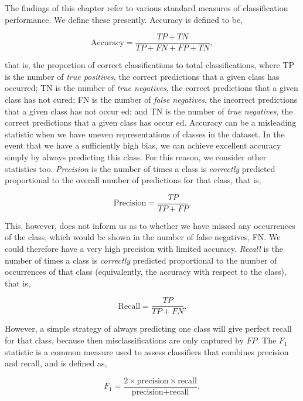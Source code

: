 The findings of this chapter refer to various standard measures of classification performance. We define these presently. Accuracy is defined to be,

\begin{equation}
\text{Accuracy} = \frac{TP + TN}{TP + FN + FP + TN},
\label{eq:accuracy}
\end{equation}

that is, the proportion of correct classifications to total classifications, where TP is the number of \emph{true positives}, the correct predictions that a given class has occurred; TN is the number of \emph{true negatives}, the correct predictions that a given class has not cured; FN is the number of \emph{false negatives}, the incorrect predictions that a given class has not occur ed; and TN is the number of \emph{true negatives}, the correct predictions that a given class has occur ed. Accuracy can be a misleading statistic when we have uneven representations of classes in the dataset. In the event that we have a sufficiently high bias, we can achieve excellent accuracy simply by always predicting this class. For this reason, we consider other statistics too. \emph{Precision} is the number of times a class is \emph{correctly} predicted proportional to the overall number of predictions for that class, that is,

\begin{equation}
\text{Precision} = \frac{TP}{TP + FP}.
\label{eq:precision}
\end{equation}

This, however, does not inform us as to whether we have missed any occurrences of the class, which would be shown in the number of false negatives, FN. We could therefore have a very high precision with limited accuracy. \emph{Recall} is the number of times a class is \emph{correctly} predicted proportional to the number of occurrences of that class (equivalently, the accuracy with respect to the class), that is,

\begin{equation}
\text{Recall} = \frac{TP}{TP + FN}.
\label{eq:recall}
\end{equation}

However, a simple strategy of always predicting one class will give perfect recall for that class, because then misclassifications are only captured by $FP$. The $F_1$ statistic is a common measure used to assess classifiers that combines precision and recall, and is defined as,

\begin{equation}
F_1 = \frac{2 \times \text{precision} \times \text{recall}}{\text{precision} + \text{recall}},
\label{eq:f1}
\end{equation}

